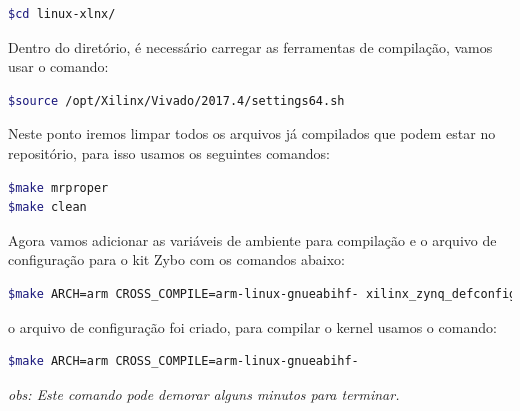 \begin{anexosenv}
\begin{lstlisting}[language=bash]
$cd linux-xlnx/
\end{lstlisting}
Dentro do diretório, é necessário carregar as ferramentas de compilação, vamos usar o comando:

\begin{lstlisting}[language=bash]
$source /opt/Xilinx/Vivado/2017.4/settings64.sh
\end{lstlisting}
Neste ponto iremos limpar todos os arquivos já compilados que podem estar no repositório, para isso usamos os seguintes comandos:
\begin{lstlisting}[language=bash]
$make mrproper
$make clean
\end{lstlisting}
Agora vamos adicionar as variáveis de ambiente para compilação e o arquivo de configuração para o kit Zybo com os comandos abaixo:
\begin{lstlisting}[language=bash]
$make ARCH=arm CROSS_COMPILE=arm-linux-gnueabihf- xilinx_zynq_defconfig
\end{lstlisting}
o arquivo de configuração foi criado, para compilar o kernel usamos o comando:
\begin{lstlisting}[language=bash]
$make ARCH=arm CROSS_COMPILE=arm-linux-gnueabihf-
\end{lstlisting}
\textit{obs: Este comando pode demorar alguns minutos para terminar.}

















\end{anexosenv}

